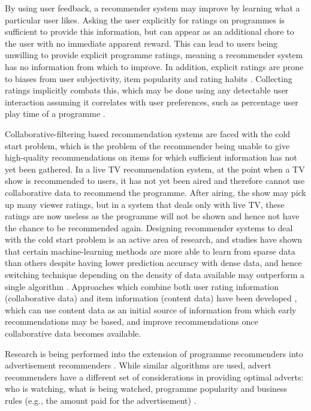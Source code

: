 	By using user feedback, a recommender system may improve by learning what a particular user likes. Asking the user explicitly for ratings on programmes is sufficient to provide this information, but can appear as an additional chore to the user with no immediate apparent reward. This can lead to users being unwilling to provide explicit programme ratings, meaning a recommender system has no information from which to improve. In addition, explicit ratings are prone to biases from user subjectivity, item popularity and rating habits \citep[p.~304]{recommender-systems-handbook}. Collecting ratings implicitly combats this, which may be done using any detectable user interaction assuming it correlates with user preferences, such as percentage user play time of a programme \citep[p.~305]{recommender-systems-handbook}.

	Collaborative-filtering based recommendation systems are faced with the cold start problem, which is the problem of the recommender being unable to give high-quality recommendations on items for which sufficient information has not yet been gathered. In a live TV recommendation system, at the point when a TV show is recommended to users, it has not yet been aired and therefore cannot use collaborative data to recommend the programme. After airing, the show may pick up many viewer ratings, but in a system that deals only with live TV, these ratings are now useless as the programme will not be shown and hence not have the chance to be recommended again. Designing recommender systems to deal with the cold start problem is an active area of research, and studies have shown that certain machine-learning methods are more able to learn from sparse data than others despite having lower prediction accuracy with dense data, and hence switching technique depending on the density of data available may outperform a single algorithm \citep{cold-start-problem}. Approaches which combine both user rating information (collaborative data) and item information (content data) have been developed \citep{generative_models}, which can use content data as an initial source of information from which early recommendations may be based, and improve recommendations once collaborative data becomes available.

	Research is being performed into the extension of programme recommenders into advertisement recommenders \citep{contextual_advertising}. While similar algorithms are used, advert recommenders have a different set of considerations in providing optimal adverts: who is watching, what is being watched, programme popularity and business rules (e.g., the amount paid for the advertisement) \citep{contextual_advertising}.

